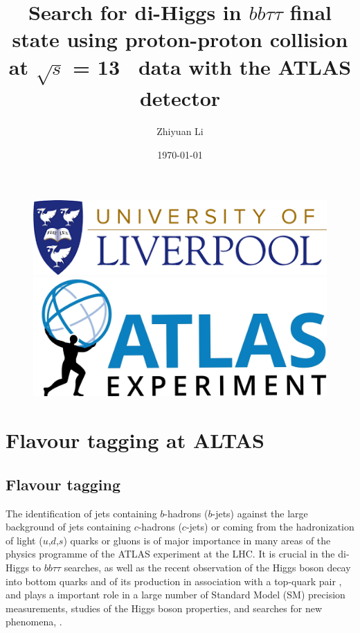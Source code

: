 \documentclass[letterpaper,12pt]{article}
\begin{document}
\title{Search for di-Higgs in $bb\tau\tau$ final state using proton-proton collision at $\sqrt{s}$ = 13 \TeV\ data with the ATLAS detector}%
\author{ Zhiyuan Li}
\date{\today}
\maketitle
\begin{figure}[htp]
\begin{minipage}[b]{.5\textwidth}
\centering
\includegraphics[width=1\textwidth]{logo.png}
\end{minipage}\hfill
\begin{minipage}[b]{.45\textwidth}
\vspace{3em}
\centering
\includegraphics[width=1\textwidth]{ATLAS-Logo-Ref-RGB-H_1.jpg}
\end{minipage}
\end{figure}
\newpage


\tableofcontents{}
\printindex{}


\newpage
\section{Flavour tagging at ALTAS}


\subsection{Flavour tagging}


The identification of jets containing $b$-hadrons ($b$-jets) 
against the large background of jets containing $c$-hadrons 
($c$-jets) or coming from the hadronization of light ($u$,$d$,$s$) 
quarks or gluons is of major importance in many areas of the 
physics programme of the ATLAS experiment at the LHC. It is 
crucial in the di-Higgs to $bb\tau\tau$ searches, as well as the recent 
observation of the Higgs boson decay into bottom quarks \cite{HIGG-2018-04} 
and of its production in association with a top-quark pair \cite{HIGG-2018-13}, 
and plays a important role in a large number of Standard Model (SM) 
precision measurements, studies of the Higgs boson properties, and 
searches for new phenomena\cite{SUSY-2014-08}, \cite{ATLAS-CONF-2018-043} \cite{Interpreting Higgs result}.
\end{document}
